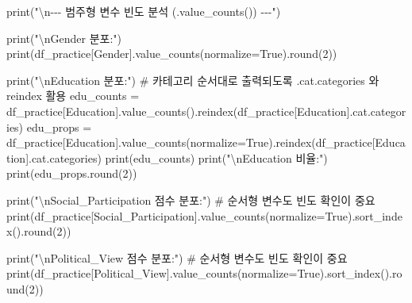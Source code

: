 \documentclass[
  letterpaper,
]{book}
\newenvironment{Shaded}{\begin{snugshade}}{\end{snugshade}}
\newcommand{\BuiltInTok}[1]{\textcolor[rgb]{0.00,0.23,0.31}{#1}}
\newcommand{\CharTok}[1]{\textcolor[rgb]{0.13,0.47,0.30}{#1}}
\newcommand{\CommentTok}[1]{\textcolor[rgb]{0.37,0.37,0.37}{#1}}
\newcommand{\DecValTok}[1]{\textcolor[rgb]{0.68,0.00,0.00}{#1}}
\newcommand{\NormalTok}[1]{\textcolor[rgb]{0.00,0.23,0.31}{#1}}
\newcommand{\OperatorTok}[1]{\textcolor[rgb]{0.37,0.37,0.37}{#1}}
\newcommand{\StringTok}[1]{\textcolor[rgb]{0.13,0.47,0.30}{#1}}
\newcommand{\VariableTok}[1]{\textcolor[rgb]{0.07,0.07,0.07}{#1}}
\begin{document}
\begin{Shaded}
\begin{Highlighting}[]
\BuiltInTok{print}\NormalTok{(}\StringTok{"}\CharTok{\textbackslash{}n}\StringTok{{-}{-}{-} 범주형 변수 빈도 분석 (.value\_counts()) {-}{-}{-}"}\NormalTok{)}

\BuiltInTok{print}\NormalTok{(}\StringTok{"}\CharTok{\textbackslash{}n}\StringTok{Gender 분포:"}\NormalTok{)}
\BuiltInTok{print}\NormalTok{(df\_practice[}\StringTok{\textquotesingle{}Gender\textquotesingle{}}\NormalTok{].value\_counts(normalize}\OperatorTok{=}\VariableTok{True}\NormalTok{).}\BuiltInTok{round}\NormalTok{(}\DecValTok{2}\NormalTok{))}

\BuiltInTok{print}\NormalTok{(}\StringTok{"}\CharTok{\textbackslash{}n}\StringTok{Education 분포:"}\NormalTok{)}
\CommentTok{\# 카테고리 순서대로 출력되도록 .cat.categories 와 reindex 활용}
\NormalTok{edu\_counts }\OperatorTok{=}\NormalTok{ df\_practice[}\StringTok{\textquotesingle{}Education\textquotesingle{}}\NormalTok{].value\_counts().reindex(df\_practice[}\StringTok{\textquotesingle{}Education\textquotesingle{}}\NormalTok{].cat.categories)}
\NormalTok{edu\_props }\OperatorTok{=}\NormalTok{ df\_practice[}\StringTok{\textquotesingle{}Education\textquotesingle{}}\NormalTok{].value\_counts(normalize}\OperatorTok{=}\VariableTok{True}\NormalTok{).reindex(df\_practice[}\StringTok{\textquotesingle{}Education\textquotesingle{}}\NormalTok{].cat.categories)}
\BuiltInTok{print}\NormalTok{(edu\_counts)}
\BuiltInTok{print}\NormalTok{(}\StringTok{"}\CharTok{\textbackslash{}n}\StringTok{Education 비율:"}\NormalTok{)}
\BuiltInTok{print}\NormalTok{(edu\_props.}\BuiltInTok{round}\NormalTok{(}\DecValTok{2}\NormalTok{))}

\BuiltInTok{print}\NormalTok{(}\StringTok{"}\CharTok{\textbackslash{}n}\StringTok{Social\_Participation 점수 분포:"}\NormalTok{) }\CommentTok{\# 순서형 변수도 빈도 확인이 중요}
\BuiltInTok{print}\NormalTok{(df\_practice[}\StringTok{\textquotesingle{}Social\_Participation\textquotesingle{}}\NormalTok{].value\_counts(normalize}\OperatorTok{=}\VariableTok{True}\NormalTok{).sort\_index().}\BuiltInTok{round}\NormalTok{(}\DecValTok{2}\NormalTok{))}

\BuiltInTok{print}\NormalTok{(}\StringTok{"}\CharTok{\textbackslash{}n}\StringTok{Political\_View 점수 분포:"}\NormalTok{) }\CommentTok{\# 순서형 변수도 빈도 확인이 중요}
\BuiltInTok{print}\NormalTok{(df\_practice[}\StringTok{\textquotesingle{}Political\_View\textquotesingle{}}\NormalTok{].value\_counts(normalize}\OperatorTok{=}\VariableTok{True}\NormalTok{).sort\_index().}\BuiltInTok{round}\NormalTok{(}\DecValTok{2}\NormalTok{))}
\end{Highlighting}
\end{Shaded}
\end{document}
